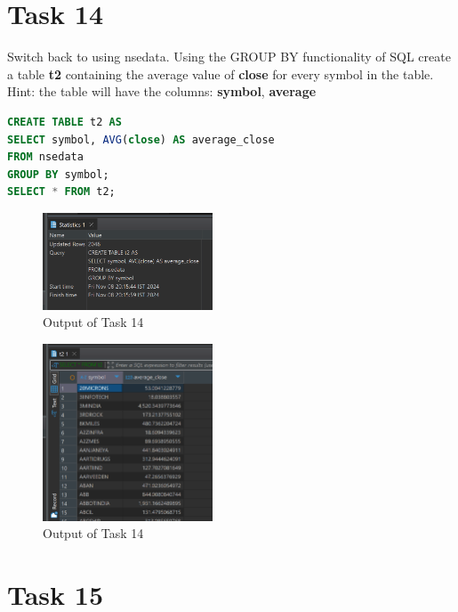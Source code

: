 \documentclass{article}
\begin{document}

\section*{Task 14}

\begin{task*}[14]
Switch back to using nsedata. Using the GROUP BY functionality of SQL create a table \textbf{t2} containing the average value of \textbf{close} for every symbol in the table. Hint: the table will have the columns: \textbf{symbol}, \textbf{average}
\end{task*}

\begin{lstlisting}[language=SQL, caption=Creating Table t2]
CREATE TABLE t2 AS
SELECT symbol, AVG(close) AS average_close
FROM nsedata
GROUP BY symbol;
SELECT * FROM t2;
\end{lstlisting}

\begin{figure}[H]
	\centering
	\includegraphics[width=0.45\textwidth]{Images/Task14-1.png}
	\caption{Output of Task 14}
\end{figure}

\begin{figure}[H]
	\centering
	\includegraphics[width=0.45\textwidth]{Images/Task14-2.png}
	\caption{Output of Task 14}
\end{figure}

\clearpage

\section*{Task 15}
\end{document}
